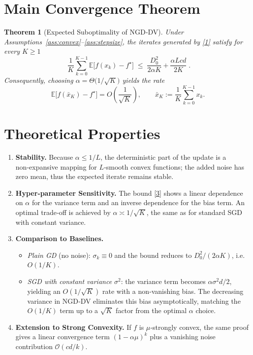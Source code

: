 \documentclass{article}
\newtheorem{theorem}{Theorem}
\begin{document}
\section*{Main Convergence Theorem}
\begin{theorem}[Expected Suboptimality of NGD‑DV]\label{thm:main}
Under Assumptions~\ref{ass:convex}–\ref{ass:stepsize}, the iterates generated by \eqref{1} satisfy for every $K\ge 1$
\[
\boxed{\;
\frac{1}{K}\sum_{k=0}^{K-1}\mathbb{E}\!\bigl[f(x_k)-f^\star\bigr]
\;\le\;
\frac{D_0^2}{2\alpha K}+\frac{\alpha L c d}{2K}\; }.
\tag{3}
\]
Consequently, choosing $\alpha=\Theta\!\bigl(1/\sqrt{K}\bigr)$ yields the rate  
\[
\mathbb{E}\!\bigl[f(\bar{x}_K)-f^\star\bigr]=O\!\left(\frac{1}{\sqrt{K}}\right),\qquad 
\bar{x}_K:=\frac{1}{K}\sum_{k=0}^{K-1}x_k .
\]
\end{theorem}

\section*{Theoretical Properties}
\begin{enumerate}[label=\arabic*.]
\item \textbf{Stability.} Because $\alpha\le 1/L$, the deterministic part of the update is a non‑expansive mapping for $L$‑smooth convex functions; the added noise has zero mean, thus the expected iterate remains stable.
\item \textbf{Hyper‑parameter Sensitivity.} The bound \eqref{3} shows a linear dependence on $\alpha$ for the variance term and an inverse dependence for the bias term. An optimal trade‑off is achieved by $\alpha\asymp 1/\sqrt{K}$, the same as for standard SGD with constant variance.
\item \textbf{Comparison to Baselines.}
    \begin{itemize}
        \item \textit{Plain GD} (no noise): $\sigma_k\equiv0$ and the bound reduces to $D_0^2/(2\alpha K)$, i.e. $O(1/K)$.
        \item \textit{SGD with constant variance $\sigma^2$}: the variance term becomes $\alpha\sigma^2 d/2$, yielding an $O(1/\sqrt{K})$ rate with a non‑vanishing bias. The decreasing variance in NGD‑DV eliminates this bias asymptotically, matching the $O(1/K)$ term up to a $\sqrt{K}$ factor from the optimal $\alpha$ choice.
    \end{itemize}
\item \textbf{Extension to Strong Convexity.} If $f$ is $\mu$‑strongly convex, the same proof gives a linear convergence term $ (1-\alpha\mu)^k$ plus a vanishing noise contribution $\mathcal{O}(c d/k)$.
\end{enumerate}
\end{document}
